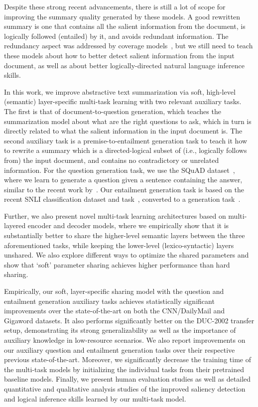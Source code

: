 \documentclass[11pt,a4paper]{article}
\begin{document}
Despite these strong recent advancements, there is still a lot of scope for improving the summary quality generated by these models. A good rewritten summary is one that contains all the salient information from the document, is logically followed (entailed) by it, and avoids redundant information. The redundancy aspect was addressed by coverage models~\cite{Suzuki2016Summ,Chen2016DistractionBasedNN,nallapati2016abstractive,see2017get}, but we still need to teach these models about how to better detect salient information from the input document, as well as about better logically-directed natural language inference skills. 

In this work, we improve abstractive text summarization via soft, high-level (semantic) layer-specific multi-task learning with two relevant auxiliary tasks. The first is that of document-to-question generation, which teaches the summarization model about what are the right questions to ask, which in turn is directly related to what the salient information in the input document is. The second auxiliary task is a premise-to-entailment generation task to teach it how to rewrite a summary which is a directed-logical subset of (i.e., logically follows from) the input document, and contains no contradictory or unrelated information. For the question generation task, we use the SQuAD dataset~\cite{rajpurkar2016squad}, where we learn to generate a question given a sentence containing the answer, similar to the recent work by~. Our entailment generation task is based on the recent SNLI classification dataset and task~\cite{bowman2015large}, converted to a generation task~\cite{pasunuru2017multitask}.  

Further, we also present novel multi-task learning architectures based on multi-layered encoder and decoder models, where we empirically show that it is substantially better to share the higher-level semantic layers between the three aforementioned tasks, while keeping the lower-level (lexico-syntactic) layers unshared. We also explore different ways to optimize the shared parameters and show that `soft' parameter sharing achieves higher performance than hard sharing. 

Empirically, our soft, layer-specific sharing model with the question and entailment generation auxiliary tasks achieves statistically significant improvements over the state-of-the-art on both the CNN/DailyMail and Gigaword datasets. It also performs significantly better on the DUC-2002 transfer setup, demonstrating its strong generalizability as well as the importance of auxiliary knowledge in low-resource scenarios. We also report improvements on our auxiliary question and entailment generation tasks over their respective previous state-of-the-art.
Moreover, we significantly decrease the training time of the multi-task models by initializing the individual tasks from their pretrained baseline models. 
Finally, we present human evaluation studies as well as detailed quantitative and qualitative analysis studies of the improved saliency detection and logical inference skills learned by our multi-task model.
\end{document}
